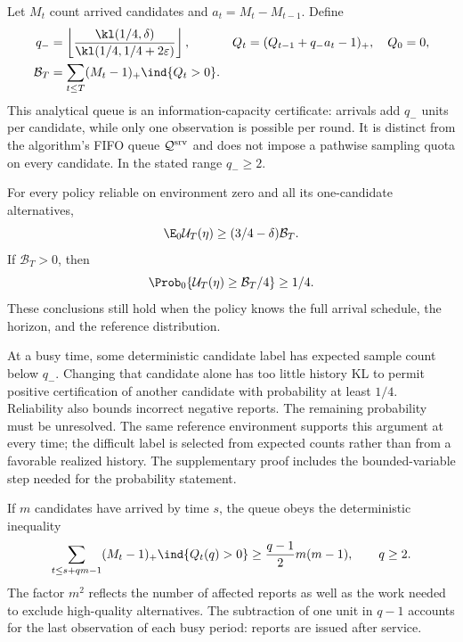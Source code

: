 Let $M_t$ count arrived candidates and $a_t=M_t-M_{t-1}$. Define
\begin{align}
 q_-&=\left\lfloor\frac{\kl(1/4,\delta)}
                              {\kl(1/4,1/4+2\varepsilon)}\right\rfloor,
 &Q_t&=(Q_{t-1}+q_-a_t-1)_+,\quad Q_0=0,\notag\\
 \mathcal B_T&=\sum_{t\le T}(M_t-1)_+\ind\{Q_t>0\}.
 \label{eq:broadcast_queue}
\end{align}
This analytical queue is an information-capacity certificate: arrivals add
$q_-$ units per candidate, while only one observation is possible per round.
It is distinct from the algorithm's FIFO queue $\mathcal Q^{\rm srv}$ and
does not impose a pathwise sampling quota on every candidate. In the stated
range $q_-\ge2$.

\begin{theorem}
\label{thm:broadcast}
For every policy reliable on environment zero and all its one-candidate
alternatives,
\[
 \E_0\mathcal U_T(\eta)\ge(3/4-\delta)\mathcal B_T.
\]
If $\mathcal B_T>0$, then
\[
 \Prob_0\{\mathcal U_T(\eta)\ge\mathcal B_T/4\}\ge1/4.
\]
These conclusions still hold when the policy knows the full arrival schedule,
the horizon, and the reference distribution.
\end{theorem}

At a busy time, some deterministic candidate label has expected sample count
below $q_-$. Changing that candidate alone has too little history KL to permit
positive certification of another candidate with probability at least $1/4$.
Reliability also bounds incorrect negative reports. The remaining probability
must be unresolved. The same reference environment supports this argument at
every time; the difficult label is selected from expected counts rather than
from a favorable realized history. The supplementary proof includes the
bounded-variable step needed for the probability statement.

If $m$ candidates have arrived by time $s$, the queue obeys the deterministic
inequality
\begin{equation}
 \sum_{t\le s+qm-1}(M_t-1)_+\ind\{Q_t(q)>0\}
                  \ge\frac{q-1}{2}m(m-1),\qquad q\ge2.
 \label{eq:queue_area}
\end{equation}
The factor $m^2$ reflects the number of affected reports as well as the work
needed to exclude high-quality alternatives. The subtraction of one unit in
$q-1$ accounts for the last observation of each busy period: reports are issued
after service.

